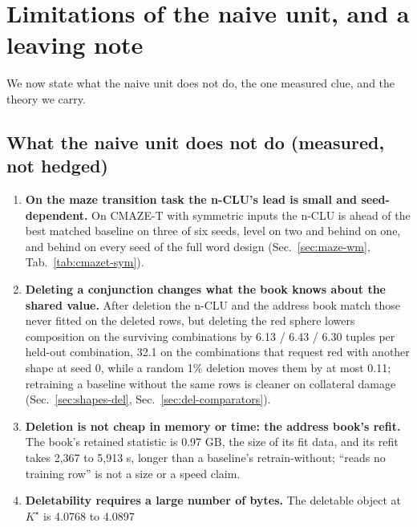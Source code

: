 \documentclass{article} %
\newcommand{\Kstar}{\ensuremath{K^{\star}}}
\begin{document}
\section{Limitations of the naive unit, and a leaving note}
\label{sec:limits}

We now state what the naive unit does not do, the one measured clue, and the theory we carry.
\subsection{What the naive unit does not do (measured, not hedged)}
\label{sec:limits-list}

\begin{enumerate}[leftmargin=*,itemsep=1pt]
\item \textbf{On the maze transition task the n-CLU's lead is small and seed-dependent.}
  On CMAZE-T with symmetric inputs the n-CLU is ahead of the best matched baseline on three of six seeds,
  level on two and behind on one, and behind on every seed of the full word design %
  (Sec.~\ref{sec:maze-wm}, Tab.~\ref{tab:cmazet-sym}).
\item \textbf{Deleting a conjunction changes what the book knows about the shared value.} After deletion
  the n-CLU and the address book match those never fitted on the deleted rows, but deleting the red
  sphere lowers composition on
  the surviving combinations by 6.13 / 6.43 / 6.30 tuples per held-out combination, 32.1 on the combinations that request red %
  with another shape at seed 0, while a random 1\% deletion moves them by at most 0.11; retraining a %
  baseline without the same rows is cleaner on collateral damage (Sec.~\ref{sec:shapes-del},
  Sec.~\ref{sec:del-comparators}).
\item \textbf{Deletion is not cheap in memory or time: the address book's refit.} The book's retained statistic is 0.97 GB, %
  the size of its fit data, and its refit takes 2,367 to 5,913 s, longer than a baseline's %
  retrain-without; ``reads no training row'' is not a size or a speed claim.
\item \textbf{Deletability requires a large number of bytes.} The deletable object at $\Kstar$ is 4.0768 to 4.0897

\end{enumerate}
\end{document}
